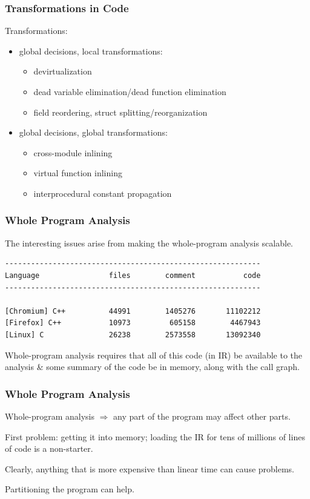 \begin{frame}
\frametitle{Transformations in Code}

Transformations:

\begin{itemize}
\item global decisions, local transformations:
\begin{itemize}
\item devirtualization
\item dead variable elimination/dead function elimination
\item field reordering, struct splitting/reorganization
\end{itemize}
\item global decisions, global transformations:
\begin{itemize}
\item cross-module inlining
\item virtual function inlining
\item interprocedural constant propagation
\end{itemize}
\end{itemize}


\end{frame}


\begin{frame}[fragile]
\frametitle{Whole Program Analysis}

The interesting issues arise from making the whole-program analysis scalable. 

\begin{verbatim}
-----------------------------------------------------------
Language                files        comment           code
-----------------------------------------------------------

[Chromium] C++          44991        1405276       11102212
[Firefox] C++           10973         605158        4467943
[Linux] C               26238        2573558       13092340
\end{verbatim}


Whole-program analysis requires that all of 
this code (in IR) be available to the analysis \& some summary of the code be in memory,  along with the call graph.

\end{frame}


\begin{frame}
\frametitle{Whole Program Analysis}

\large


Whole-program analysis $\Rightarrow$ any part of the program may affect other parts. 

First problem: getting it into memory; loading the IR for tens of millions of lines of code is a non-starter.


Clearly, anything that is more expensive than linear time can cause problems. 

Partitioning the program can help.


\end{frame}



